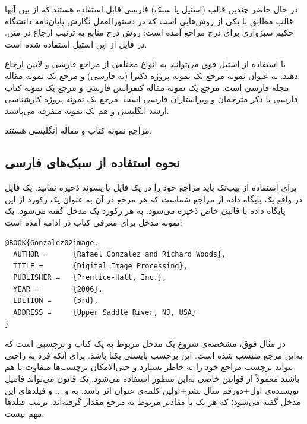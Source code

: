 در حال حاضر چندین قالب (استیل یا سبک) فارسی قابل استفاده هستند که از بین آنها قالب
مطابق با یکی از روش‌هایی است که در دستورالعمل نگارش پایان‌نامه دانشگاه حکیم سبزواری برای درج مراجع آمده است: روش درج منابع به ترتیب ارجاع در متن. در فایل 
از این استیل استفاده شده است.

با استفاده از استیل فوق می‌توانید به انواع مختلفی از مراجع فارسی و لاتین ارجاع دهید. به عنوان نمونه مرجع 
\cite{Omidali82phdThesis}
 یک نمونه پروژه دکترا (به فارسی) و مرجع 
\cite{Vahedi87} یک نمونه مقاله مجله فارسی است.
مرجع 
\cite{Amintoosi87afzayesh}  یک نمونه  مقاله کنفرانس فارسی و
مرجع 
\cite{Pedram80osool} یک نمونه کتاب فارسی با ذکر مترجمان و ویراستاران فارسی است. مرجع 
\cite{Khalighi07MscThesis} یک نمونه پروژه کارشناسی ارشد انگلیسی و
\cite{Khalighi2015xepersian} هم یک نمونه متفرقه  می‌باشند.

مراجع 
\cite{Gonzalez02book,Baker02limits} 
نمونه کتاب و مقاله انگلیسی هستند.


\subsection{ نحوه استفاده از سبک‌های فارسی}


برای استفاده از بیب‌تک باید مراجع خود را در یک فایل با پسوند  ذخیره نمایید. یک فایل  در واقع یک پایگاه داده از مراجع  شماست که هر مرجع در آن به عنوان یک رکورد از این پایگاه داده
با قالبی خاص ذخیره می‌شود. به هر رکورد یک مدخل گفته می‌شود. یک نمونه مدخل برای معرفی کتاب  در ادامه آمده است:

\singlespacing
\begin{LTR}
\begin{verbatim}
@BOOK{Gonzalez02image,
  AUTHOR =      {Rafael Gonzalez and Richard Woods},
  TITLE =       {Digital Image Processing},
  PUBLISHER =   {Prentice-Hall, Inc.},
  YEAR =        {2006},
  EDITION =     {3rd},
  ADDRESS =     {Upper Saddle River, NJ, USA}
}
\end{verbatim}
\end{LTR}
\doublespacing

در مثال فوق،  مشخصه‌ی شروع یک مدخل مربوط به یک کتاب و  برچسبی است که به‌این مرجع منتسب شده است.
 این برچسب بایستی یکتا باشد. برای آنکه فرد به راحتی بتواند برچسب مراجع خود را به خاطر بسپارد و حتی‌الامکان برچسب‌ها متفاوت با هم باشند معمولاً از قوانین خاصی به‌این منظور استفاده می‌شود. یک قانون می‌تواند فامیل نویسنده‌ی اول+دورقم سال نشر+اولین کلمه‌ی عنوان اثر باشد. به  و $\dots$ و  فیلدهای این مدخل گفته می‌شود؛ که هر یک با مقادیر مربوط به مرجع مقدار گرفته‌اند. ترتیب فیلدها مهم نیست. 

